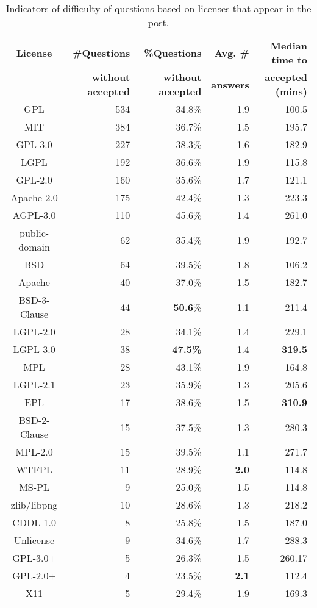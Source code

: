 \documentclass{elsarticle}
\begin{document}
\begin{table}
  \caption{Indicators of difficulty of questions based on licenses that appear in the post.}
  \label{tab:licenses-difficulty}
  \centering
  \begin{adjustbox}{width=0.9\textwidth}
  \begin{tabular}{crrrr}
    \hline
     \textbf{License} & \textbf{\#Questions} & \textbf{\%Questions} & \textbf{Avg. \#} & \textbf{Median time to} \\
     &\textbf{without accepted}& \textbf{without accepted} & \textbf{answers} &\textbf{accepted (mins)}\\
     \hline
GPL & 534 & 34.8\%& 1.9& 100.5\\
MIT & 384& 36.7\%& 1.5& 195.7\\
GPL-3.0 & 227& 38.3\%& 1.6& 182.9\\
LGPL & 192& 36.6\%& 1.9& 115.8\\
GPL-2.0 & 160& 35.6\%& 1.7& 121.1\\
Apache-2.0 & 175& 42.4\%& 1.3& 223.3\\
AGPL-3.0 & 110& 45.6\%& 1.4& 261.0\\
public-domain & 62& 35.4\%& 1.9 & 192.7\\
BSD & 64& 39.5\% & 1.8& 106.2\\
Apache & 40& 37.0\% & 1.5& 182.7\\
BSD-3-Clause & 44& \textbf{50.6}\% & 1.1& 211.4\\
LGPL-2.0 & 28& 34.1\% & 1.4& 229.1\\
LGPL-3.0 & 38& \textbf{47.5\%} & 1.4& \textbf{319.5}\\
MPL & 28& 43.1\% & 1.9& 164.8\\
LGPL-2.1 &23 & 35.9\% & 1.3& 205.6\\
EPL & 17& 38.6\% & 1.5& \textbf{310.9}\\
BSD-2-Clause & 15& 37.5\% & 1.3& 280.3\\
MPL-2.0 & 15& 39.5\% & 1.1& 271.7\\
WTFPL & 11& 28.9\% & \textbf{2.0}& 114.8\\
MS-PL & 9& 25.0\% & 1.5& 114.8\\
zlib/libpng & 10& 28.6\% & 1.3& 218.2\\
CDDL-1.0 & 8& 25.8\% & 1.5& 187.0\\
Unlicense & 9& 34.6\% & 1.7& 288.3\\
GPL-3.0+ & 5& 26.3\% & 1.5& 260.17\\
GPL-2.0+ & 4& 23.5\%& \textbf{2.1}& 112.4\\
X11 & 5& 29.4\% & 1.9& 169.3\\
  \hline
\end{tabular}
\end{adjustbox}
\end{table}
\end{document}

